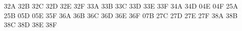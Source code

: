 { \Emtsyadef@{}
 \Emtsyadef@{}
 \Emtsyadef@{}
 \Emtsyadef@{}
 \Emtsyadef@\because32A
 \Emtsyadef@\doteqdot32B
 \let\Doteq\doteqdot
 \Emtsyadef@\triangleq32C
 \Emtsyadef@\precsim32D
 \Emtsyadef@\lesssim32E
 \Emtsyadef@\lessapprox32F
 \Emtsyadef@{}
 \Emtsyadef@{}
 \Emtsyadef@{}
 \Emtsyadef@{}
 \Emtsyadef@{}
 \Emtsyadef@{}
 \Emtsyadef@{}
 \Emtsyadef@{}
 \Emtsyadef@{}
 \Emtsyadef@\risingdotseq33A
 \Emtsyadef@\fallingdotseq33B
 \Emtsyadef@\succcurlyeq33C
 \Emtsyadef@\geqq33D
 \Emtsyadef@\geqslant33E
 \Emtsyadef@\gtrless33F
 \Emtsyadef@{}
 \Emtsyadef@{}
 \Emtsyadef@{}
 \Emtsyadef@{}
 \Emtsyadef@{}
 \Emtsyadef@{}
 \Emtsyadef@{}
 \Emtsyadef@{}
 \Emtsyadef@{}
 \Emtsyadef@{}
 \Emtsyadef@\blacktriangleleft34A
 \Emtsyadef@\vartriangle34D
 \Emtsyadef@\blacktriangle04E
 \Emtsyadef@\triangledown04F
 \Emtsyadef@{}
 \Emtsyadef@{}
 \Emtsyadef@{}
 \Emtsyadef@{}
 \Emtsyadef@{}
 \Emtsyadef@{}
 \Emtsyadef@{}
 \Emtsyadef@{}
 \Emtsyadef@\barwedge25A
 \Emtsyadef@\doublebarwedge25B
 \Emtsyadef@\measuredangle05D
 \Emtsyadef@\sphericalangle05E
 \Emtsyadef@\varpropto35F
 \Emtsyadef@{}
 \Emtsyadef@{}
 \Emtsyadef@{}
 \Emtsyadef@{}
 \Emtsyadef@{}
 \let\doublecup\Cup
 \Emtsyadef@{}
 \let\doublecap\Cap
 \Emtsyadef@{}
 \Emtsyadef@{}
 \Emtsyadef@{}
 \Emtsyadef@{}
 \Emtsyadef@\subseteqq36A
 \Emtsyadef@\supseteqq36B
 \Emtsyadef@\bumpeq36C
 \Emtsyadef@\Bumpeq36D
 \Emtsyadef@\lll36E
 \let\llless\lll
 \Emtsyadef@\ggg36F
 \let\gggtr\ggg
 \Emtsyadef@{}
 \Emtsyadef@{}
 \Emtsyadef@{}
 \Emtsyadef@{}
 \Emtsyadef@{}
 \Emtsyadef@\complement07B
 \Emtsyadef@\intercal27C
 \Emtsyadef@\circledcirc27D
 \Emtsyadef@\circledast27E
 \Emtsyadef@\circleddash27F
 \Emtsyadef@{}
 \Emtsyadef@{}
 \Emtsyadef@{}
 \Emtsyadef@{}
 \Emtsyadef@{}
 \Emtsyadef@{}
 \Emtsyadef@{}
 \Emtsyadef@{}
 \Emtsyadef@{}
 \Emtsyadef@{}
 \Emtsyadef@\nleqslant38A
 \Emtsyadef@\ngeqslant38B
 \Emtsyadef@\lneq38C
 \Emtsyadef@\gneq38D
 \Emtsyadef@\npreceq38E
 \Emtsyadef@\nsucceq38F
 \Emtsyadef@{}
 \Emtsyadef@{}
 \Emtsyadef@{}
 \Emtsyadef@{}
}
